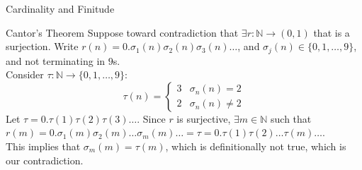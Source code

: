 \documentclass[8pt]{extarticle}
\begin{document}
\begin{problem}{Cardinality and Finitude}
\begin{problem}{Cantor's Theorem}
      Suppose toward contradiction that $\exists r:\mathbb{N} \rightarrow (0,1)$ that is a surjection. Write $r(n) = 0.\sigma_1(n)\sigma_2(n)\sigma_3(n)\dots$, and $\sigma_j(n) \in \{0,1,\dots,9\}$, and not terminating in $9$s.\\

      Consider $\tau: \mathbb{N} \rightarrow \{0,1,\dots,9\}$:
      \[
        \tau(n) = \begin{cases}
          3 & \sigma_n(n) = 2\\
          2 & \sigma_n(n) \neq 2
        \end{cases}
      \]
      Let $\tau = 0.\tau(1)\tau(2)\tau(3)\dots$. Since $r$ is surjective, $\exists m\in \mathbb{N}$ such that $r(m) = 0.\sigma_1(m)\sigma_2(m)\dots \sigma_m(m)\dots = \tau = 0.\tau(1)\tau(2)\dots\tau(m)\dots$.\\

      This implies that $\sigma_m(m) = \tau(m)$, which is definitionally not true, which is our contradiction.
    \end{problem}
  \end{problem}
\end{document}
